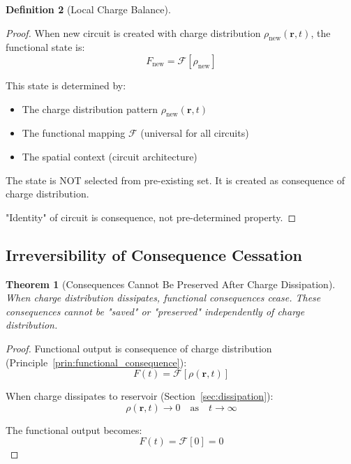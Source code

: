\documentclass[12pt,a4paper]{article}
\theoremstyle{plain}
\newtheorem{theorem}{Theorem}[section]
\theoremstyle{definition}
\newtheorem{definition}[theorem]{Definition}
\theoremstyle{remark}
\begin{document}
\begin{definition}[Local Charge Balance]
\begin{proof}
When new circuit is created with charge distribution $\rho_{\text{new}}(\mathbf{r},t)$, the functional state is:
\begin{equation}
F_{\text{new}} = \mathcal{F}[\rho_{\text{new}}]
\end{equation}

This state is determined by:
\begin{itemize}
\item The charge distribution pattern $\rho_{\text{new}}(\mathbf{r},t)$
\item The functional mapping $\mathcal{F}$ (universal for all circuits)
\item The spatial context (circuit architecture)
\end{itemize}

The state is NOT selected from pre-existing set. It is created as consequence of charge distribution.

"Identity" of circuit is consequence, not pre-determined property.
\end{proof}

\subsection{Irreversibility of Consequence Cessation}

\begin{theorem}[Consequences Cannot Be Preserved After Charge Dissipation]
\label{thm:consequence_cessation}
When charge distribution dissipates, functional consequences cease. These consequences cannot be "saved" or "preserved" independently of charge distribution.
\end{theorem}

\begin{proof}
Functional output is consequence of charge distribution (Principle~\ref{prin:functional_consequence}):
\begin{equation}
F(t) = \mathcal{F}[\rho(\mathbf{r},t)]
\end{equation}

When charge dissipates to reservoir (Section~\ref{sec:dissipation}):
\begin{equation}
\rho(\mathbf{r},t) \to 0 \quad \text{as} \quad t \to \infty
\end{equation}

The functional output becomes:
\begin{equation}
F(t) = \mathcal{F}[0] = 0
\end{equation}


\end{proof}
\end{definition}
\end{document}
